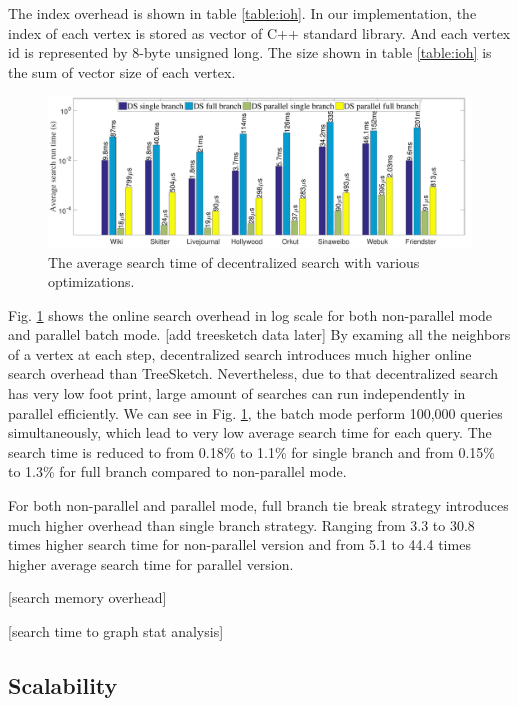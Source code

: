 The index overhead is shown in table \ref{table:ioh}. In our implementation, the index of each vertex is stored as vector of C++ standard library. And each vertex id is represented by 8-byte unsigned long. The size shown in table \ref{table:ioh} is the sum of vector size of each vertex. 

\begin{figure}[t]
    \centering
    \includegraphics[width=\linewidth]{./figures/overhead_search.pdf}
    \caption{The average search time of decentralized search with various optimizations.}
    \label{fig:overhead_search}
\end{figure}

Fig. \ref{fig:overhead_search} shows the online search overhead in log scale for both non-parallel mode and parallel batch mode. [add treesketch data later] By examing all the neighbors of a vertex at each step, decentralized search introduces much higher online search overhead than TreeSketch. Nevertheless, due to that decentralized search has very low foot print, large amount of searches can run independently in parallel efficiently. We can see in Fig. \ref{fig:overhead_search}, the batch mode perform 100,000 queries simultaneously, which lead to very low average search time for each query. The search time is reduced to from 0.18\% to 1.1\% for single branch and from 0.15\% to 1.3\% for full branch compared to non-parallel mode. 

For both non-parallel and parallel mode, full branch tie break strategy introduces much higher overhead than single branch strategy. Ranging from 3.3 to 30.8 times higher search time for non-parallel version and from 5.1 to 44.4 times higher average search time for parallel version.

[search memory overhead]

[search time to graph stat analysis]

\subsection{Scalability}
\label{eval_scalability}

